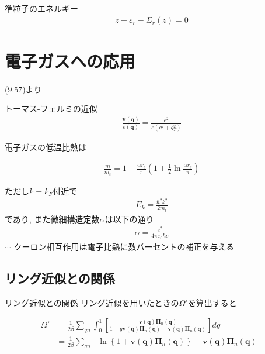\documentclass[dvipdfmx,10pt]{beamer}
\begin{document}
\begin{frame}
    \begin{block}{準粒子のエネルギー}
        \begin{align*}
            z - \varepsilon_r - \Sigma_r(z)= 0 \tag{51a}
        \end{align*}
    \end{block}
\end{frame}

\section{電子ガスへの応用}
\begin{frame}
    (9.57)より
    \begin{block}{トーマス-フェルミの近似}
        \begin{align*}
            \frac{\bm{v}(\bm{q})}{\varepsilon(\bm{q})} = \frac{e^2}{\varepsilon(q^2+q_T^2)}
        \end{align*}
    \end{block}
\end{frame}
\begin{frame}
    電子ガスの低温比熱は
    \begin{block}{}
        \begin{align*}
            \frac{m}{m_t} = 1 - \frac{\alpha r_s}{\pi}\left(1 + \frac{1}{2}\ln{\frac{\alpha r_s}{\pi}}\right) \tag{67}
        \end{align*}
    \end{block}
    ただし$k=k_F$付近で
    \begin{align*}
        E_k = \frac{\hbar^2k^2}{2m_t}
    \end{align*}
    であり, また微細構造定数$\alpha$は以下の通り
    \begin{align*}
        \alpha = \frac{e^2}{4\pi \varepsilon_0\hbar c}
    \end{align*}
    $\cdots$ クーロン相互作用は電子比熱に数パーセントの補正を与える
\end{frame}

\subsection{リング近似との関係}
\begin{frame}{リング近似との関係}
    リング近似を用いたときの$\Omega'$を算出すると
    \begin{block}{}
        \begin{align*}
            \Omega' &= \frac{1}{2\beta}\sum_{qn}\int_0^1\left[\frac{\bm{v}(\bm{q})\bm{\Pi}_n(\bm{q})}{1+g\bm{v}(\bm{q})\bm{\Pi}_n(\bm{q})-\bm{v}(\bm{q})\bm{\Pi}_n(\bm{q})}\right]dg \\
            &= \frac{1}{2\beta}\sum_{qn}\left[\ln\left\{1 +\bm{v}(\bm{q})\bm{\Pi}_n(\bm{q}) \right\}-\bm{v}(\bm{q})\bm{\Pi}_n(\bm{q})\right] \tag{71}
        \end{align*}
    \end{block}
\end{frame}
\end{document}
